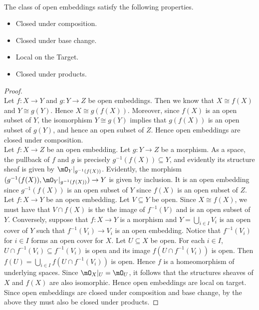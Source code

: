 \documentclass[a4paper]{article}
\begin{document}
\begin{lmm}{}{}\\
The class of open embeddings satisfy the following properties. 
\begin{itemize}
\item Closed under composition. 
\item Closed under base change. 
\item Local on the Target. 
\item Closed under products. 
\end{itemize}
\begin{proof}\\
Let $f:X\to Y$ and $g:Y\to Z$ be open embeddings. Then we know that $X\cong f(X)$ and $Y\cong g(Y)$. Hence $X\cong g(f(X))$. Moreover, since $f(X)$ is an open subset of $Y$, the isomorphism $Y\cong g(Y)$ implies that $g(f(X))$ is an open subset of $g(Y)$, and hence an open subset of $Z$. Hence open embeddings are closed under composition. \\

Let $f:X\to Z$ be an open embedding. Let $g:Y\to Z$ be a morphism. As a space, the pullback of $f$ and $g$ is precisely $g^{-1}(f(X))\subseteq Y$, and evidently its structure sheaf is given by $\mO_Y|_{g^{-1}(f(X))}$. Evidently, the morphism $(g^{-1}(f(X)),\mO_Y|_{g^{-1}(f(X))})\to Y$ is given by inclusion. It is an open embedding since $g^{-1}(f(X))$ is an open subset of $Y$ since $f(X)$ is an open subset of $Z$. \\

Let $f:X\to Y$ be an open embedding. Let $V\subseteq Y$ be open. Since $X\cong f(X)$, we must have that $V\cap f(X)$ is the the image of $f^{-1}(V)$ and is an open subset of $Y$. Conversely, suppose that $f:X\to Y$ is a morphism and $Y=\bigcup_{i\in I}V_i$ is an open cover of $Y$ such that $f^{-1}(V_i)\to V_i$ is an open embedding. Notice that $f^{-1}(V_i)$ for $i\in I$ forms an open cover for $X$. Let $U\subseteq X$ be open. For each $i\in I$, $U\cap f^{-1}(V_i)\subseteq f^{-1}(V_i)$ is open and its image $f(U\cap f^{-1}(V_i))$ is open. Then $f(U)=\bigcup_{i\in I}f(U\cap f^{-1}(V_i))$ is open. Hence $f$ is a homeomorphism of underlying spaces. Since $\mO_X|_U=\mO_U$, it follows that the structures sheaves of $X$ and $f(X)$ are also isomorphic. Hence open embeddings are local on target. \\

Since open embeddings are closed under composition and base change, by the above they must also be closed under products. 
\end{proof}
\end{lmm}
\end{document}
